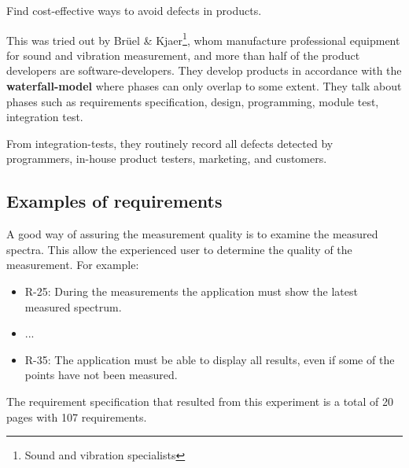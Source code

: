 Find cost-effective ways to avoid defects in products.

This was tried out by Brüel \& Kjaer\footnote{Sound and vibration specialists}, whom manufacture professional equipment for sound and vibration measurement, and more than half of the product developers are software-developers. They develop products in accordance with the \textbf{waterfall-model} where phases can only overlap to some extent. They talk about phases such as requirements specification, design, programming, module test, integration test. 

From integration-tests, they routinely record all defects detected by programmers, in-house product testers, marketing, and customers.

\subsection{Examples of requirements}
A good way of assuring the measurement quality is to examine the measured spectra. This allow the experienced user to determine the quality of the measurement. For example:

\begin{itemize}
    \item R-25: During the measurements the application must show the latest measured spectrum.
    \item ...
    \item R-35: The application must be able to display all results, even if some of the points have not been measured.
\end{itemize}

The requirement specification that resulted from this experiment is a total of 20 pages with 107 requirements. 

